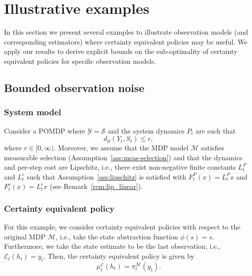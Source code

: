 \documentclass[letterpaper, 10pt]{IEEEtran}
\theoremstyle{plain}
\theoremstyle{nonumberplain}
\theoremstyle{plain}
\newcommand*\ALPHABET{\mathcal}
\newcommand\EST{\mathcal{E}}
\begin{document}
\section{Illustrative examples} \label{sec:examples}
In this section we present several examples to illustrate observation models (and corresponding estimators) where certainty equivalent policies may be useful. We apply our results to derive explicit bounds on the sub-optimality of certainty equivalent policies for specific observation models. 

\subsection{Bounded observation noise}\label{sec:bounded}

\subsubsection{System model}
Consider a POMDP where $\ALPHABET Y = \ALPHABET S$ and the system dynamics $P_t$ are such that
\[
    d_{\ALPHABET S}(Y_t, S_t) \le r,
\]
where $r \in [0, \infty)$. Moreover, we assume that the MDP model $\ALPHABET M$ satisfies measurable selection (Assumption~\ref{ass:meas-selection}) and  that the dynamics and per-step cost are Lipschitz, i.e., there exist non-negative finite constants $L_t^P$ and $L_t^c$ such that Assumption~\ref{ass:lipschitz} is satisfied with $F_t^P(x)=L_t^P x$ and $F_t^c (x) = L_t^c x$ (see Remark~\ref{rem:lip_linear}).

\subsubsection{Certainty equivalent policy}
For this example, we consider certainty equivalent policies with respect to the original MDP $\ALPHABET M$, i.e., take the state abstraction function $\phi(s) = s$.  Furthermore, we take the state estimate to be the last observation, i.e., $\EST_t(h_t) = y_t$. Then, the certainty equivalent policy is given by
\[
    \mu_t^{\EST}(h_t) = \pi^{\ALPHABET M}_t(y_t).
\]
\end{document}
